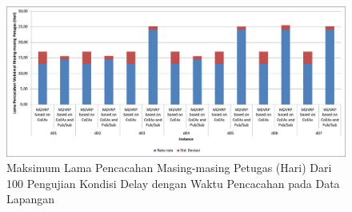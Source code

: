 \begin{figure}[!]
	\centering
	\includegraphics[width=\textwidth]{Resources/Images/test_result_delay_real_tw_mean_stdev_of_total_time}
	\captionsetup{format=hang}
	\caption{Maksimum Lama Pencacahan Masing-masing Petugas (Hari) Dari 100 Pengujian Kondisi Delay dengan Waktu Pencacahan pada Data Lapangan}
	\label{fig:test_result_delay_real_tw_mean_stdev_of_total_time}
\end{figure}









